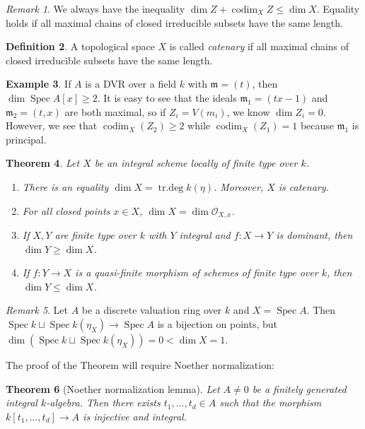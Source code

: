 \documentclass[leqno, openany]{memoir}
\newtheorem{thm}{Theorem}[section]
\theoremstyle{definition}
\newtheorem{defn}[thm]{Definition}
\newtheorem{exm}[thm]{Example}
\theoremstyle{remark}
\newtheorem{rmk}[thm]{Remark}
\theoremstyle{plain}
\theoremstyle{definition}
\theoremstyle{remark}
\newcommand{\mf}[1]{\mathfrak{#1}}
\newcommand{\msc}[1]{\mathscr{#1}}
\DeclareMathOperator{\Spec}{Spec}
\DeclareMathOperator{\codim}{codim}
\begin{document}
\begin{rmk}
    We always have the inequality $\dim Z + \codim_X Z \leq \dim X$. Equality holds if all maximal chains of closed irreducible subsets have the same length.
\end{rmk}

\begin{defn}
    A topological space $X$ is called \textit{catenary} if all maximal chains of closed irreducible subsets have the same length. 
\end{defn}

\begin{exm}
    If $A$ is a DVR over a field $k$ with $\mf{m} = (t)$, then $\dim \Spec A[x] \geq 2$. It is easy to see that the ideals $\mf{m}_1 = (tx-1)$ and $\mf{m}_2 = (t,x)$ are both maximal, so if $Z_i = V(m_i)$, we know $\dim Z_i = 0$. However, we see that $\codim_X(Z_2) \geq 2$ while $\codim_X (Z_1) = 1$ because $\mf{m}_1$ is principal.
\end{exm}

\begin{thm}\label{thm:dimfinitetype}
    Let $X$ be an integral scheme locally of finite type over $k$.
    \begin{enumerate}
        \item There is an equality $\dim X = \operatorname{tr.deg} k(\eta)$. Moreover, $X$ is catenary.
        \item For all closed points $x \in X$, $\dim X = \dim \msc{O}_{X,x}$.
        \item If $X, Y$ are finite type over $k$ with $Y$ integral and $f \colon X \to Y$ is dominant, then $\dim Y \geq \dim X$.
        \item If $f \colon Y \to X$ is a quasi-finite morphism of schemes of finite type over $k$, then $\dim Y \leq \dim X$.
    \end{enumerate}
\end{thm}

\begin{rmk}
    Let $A$ be a discrete valuation ring over $k$ and $X = \Spec A$. Then $\Spec k \sqcup \Spec k(\eta_X) \to \Spec A$ is a bijection on points, but $\dim (\Spec k \sqcup \Spec k(\eta_X)) = 0 < \dim X = 1$.
\end{rmk}

The proof of the Theorem will require Noether normalization:
\begin{thm}[Noether normalization lemma]
    Let $A \neq 0$ be a finitely generated integral $k$-algebra. Then there exists $t_1, \ldots, t_d \in A$ such that the morphism $k[t_1, \ldots, t_d] \to A$ is injective and integral.
\end{thm}
\end{document}
